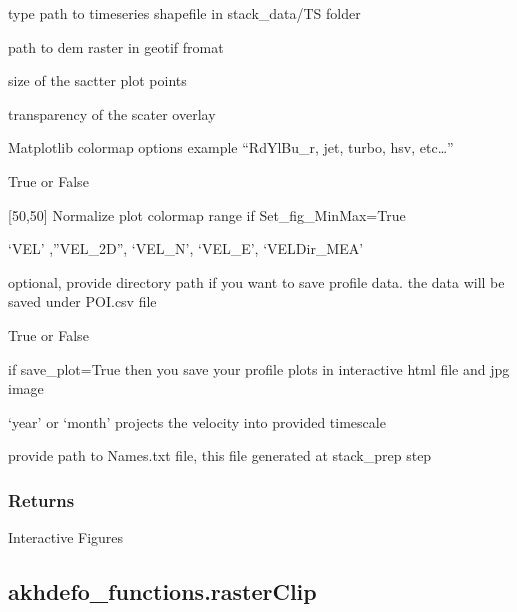 \documentclass[letterpaper,10pt]{sphinxmanual}
\begin{document}
\begin{fulllineitems}
\begin{description}
\sphinxAtStartPar
type path to timeseries shapefile in stack\_data/TS folder

\sphinxAtStartPar
path to dem raster in geotif fromat

\sphinxAtStartPar
size of the sactter plot points

\sphinxAtStartPar
transparency of the scater overlay

\sphinxAtStartPar
Matplotlib colormap options example “RdYlBu\_r, jet, turbo, hsv, etc…”

\sphinxAtStartPar
True or False

\sphinxAtStartPar
{[}\sphinxhyphen{}50,50{]}  Normalize plot colormap range if Set\_fig\_MinMax=True

\sphinxAtStartPar
‘VEL’ ,”VEL\_2D”, ‘VEL\_N’, ‘VEL\_E’, ‘VELDir\_MEA’

\sphinxAtStartPar
optional, provide directory path if you want to save profile data.
the data will be saved under POI.csv file

\sphinxAtStartPar
True or False

\sphinxAtStartPar
if save\_plot=True then
you save your profile plots in interactive html file and jpg image

\sphinxAtStartPar
‘year’ or ‘month’ projects the velocity into provided time\sphinxhyphen{}scale

\sphinxAtStartPar
provide path to Names.txt file, this file generated at stack\_prep step

\end{description}


\subsubsection{Returns}
\label{\detokenize{generated/akhdefo_functions.akhdefo_ts_plot:returns}}
\sphinxAtStartPar
Interactive Figures

\end{fulllineitems}


\sphinxstepscope


\subsection{akhdefo\_functions.rasterClip}
\label{\detokenize{generated/akhdefo_functions.rasterClip:akhdefo-functions-rasterclip}}\label{\detokenize{generated/akhdefo_functions.rasterClip::doc}}
\end{document}
